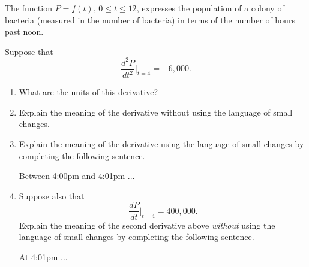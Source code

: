 \documentclass{ximera}
\begin{document}
\begin{question} \label{Q59dfgnmnmcxcv}
The function $P=f(t)$, $0\leq t \leq 12$, expresses the population of a colony of bacteria (measured in the number of bacteria) in terms of the number of hours past noon.

Suppose that
\begin{equation}
   \frac{d^2 P}{dt^2} \Big|_{t=4} =  -6,000 .  %
\end{equation}


\begin{enumerate}
\item What are the units of this derivative?

\item Explain the meaning of the derivative without using the language of small changes.

\item Explain the meaning of the derivative using the language of small changes by completing the following sentence.

Between 4:00pm and 4:01pm  ...

\item Suppose also that
\[
   \frac{dP}{dt}\Big|_{t=4} = 400,000 .
\]
Explain the meaning of the second derivative above \emph{without} using the language of small changes by completing the following sentence.

At 4:01pm  ...

\end{enumerate}
\end{question}
\end{document}
